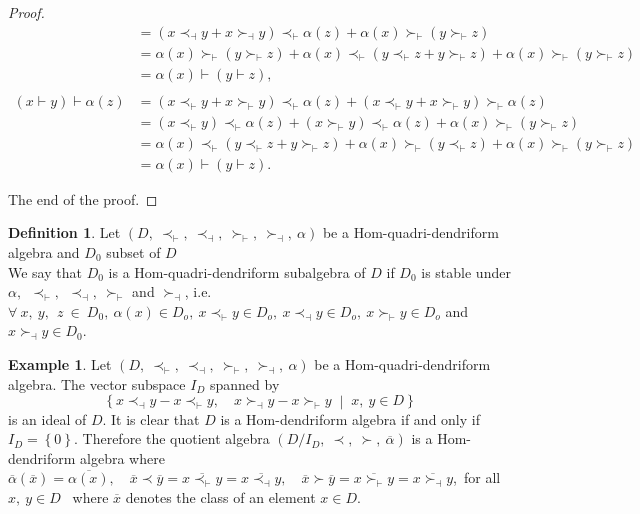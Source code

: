 \documentclass[11pt,twoside,reqno]{amsart}
\theoremstyle{plain}
\theoremstyle{definition}
\newtheorem{ex}[thm]{Example}
\newtheorem{definition}[thm]{Definition}
\begin{document}
\begin{proof}
\begin{align*}
&= (x \prec_\dashv y + x \succ_\dashv y) \prec_\vdash \alpha(z) + \alpha(x) \succ_\vdash (y \succ_\vdash z) \\
&= \alpha(x) \succ_\vdash (y \succ_\vdash z) + \alpha(x) \prec_\vdash (y \prec_\vdash z + y \succ_\vdash z) + \alpha(x) \succ_\vdash (y \succ_\vdash z) \\
&= \alpha(x) \vdash (y \vdash z), \\
\\
(x \vdash y) \vdash \alpha(z) 
&= (x \prec_\vdash y + x \succ_\vdash y) \prec_\vdash \alpha(z) + (x \prec_\vdash y + x \succ_\vdash y) \succ_\vdash \alpha(z) \\
&= (x \prec_\vdash y) \prec_\vdash \alpha(z) + (x \succ_\vdash y) \prec_\vdash \alpha(z) + \alpha(x) \succ_\vdash (y \succ_\vdash z) \\
&= \alpha(x) \prec_\vdash (y \prec_\vdash z + y \succ_\vdash z) + \alpha(x) \succ_\vdash (y \prec_\vdash z) + \alpha(x) \succ_\vdash (y \succ_\vdash z) \\
&= \alpha(x) \vdash (y \vdash z).
\end{align*}

The end of the proof.
\end{proof}
\begin{definition}\label{d9}
Let $(D,\  \prec_\vdash,\  \prec_\dashv,\  \succ_\vdash,\  \succ_\dashv ,\ \alpha)$ be a Hom-quadri-dendriform algebra and $D_0$ subset of $D$\\
We say that $D_0$ is a Hom-quadri-dendriform subalgebra of $D$ if $D_0$ is  stable under $\alpha, \  \ \prec_\vdash,\  \ \prec_\dashv,\   \succ_\vdash$ and $\succ_\dashv$, i.e. $\forall\ x,\  y  ,\ \ z \ \in \ D_0 ,\ \alpha(x) \in D_o,\  x\prec_\vdash y\in D_o , \ x\prec_\dashv y\in D_o  ,\ x\succ_\vdash y\in D_o$ and $x\succ_\dashv y \in D_0.$
\end{definition}
\begin{ex}\label{exemple3.5}
  Let $(D,\  \prec_\vdash,\  \prec_\dashv,\  \succ_\vdash,\  \succ_\dashv,\  \alpha) $  be a Hom-quadri-dendriform algebra. The vector subspace $I_D$ spanned by
  \[
\left\{
x \prec_\dashv y - x \prec_\vdash y ,\quad 
x \succ_\dashv y - x \succ_\vdash y 
\;\middle|\; x,\ y \in D
\right\}
\]
 is an ideal of $D$. It is clear that $D$ is a Hom-dendriform algebra if and only if  $I_D=\left\{0\right\}$. Therefore  the quotient algebra $(D / I_D ,\  \prec ,\ \succ ,\ \overline{\alpha})$ is a Hom-dendriform algebra where\\ 
 $\overline{\alpha}(\overline{x})=\overline{\alpha(x)} ,\quad
\overline{x} \prec \overline{y} = \overline{x \prec_{\vdash} y} = \overline{x \prec_{\dashv} y}  ,\quad
\overline{x} \succ \overline{y} = \overline{x \succ_{\vdash} y}= \overline{x \succ_{\dashv} y}$,\  
 for all $x,\  y \in D$ \ where $\overline{x}$ denotes the class of an element $x \in D$.
\end{ex}
\end{document}
